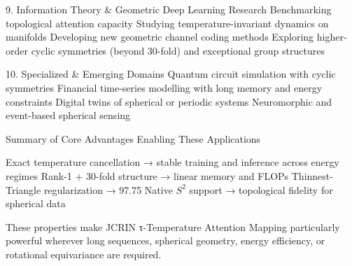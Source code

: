 9. Information Theory & Geometric Deep Learning Research
Benchmarking topological attention capacity
Studying temperature-invariant dynamics on manifolds
Developing new geometric channel coding methods
Exploring higher-order cyclic symmetries (beyond 30-fold) and exceptional group structures

10. Specialized & Emerging Domains
Quantum circuit simulation with cyclic symmetries
Financial time-series modelling with long memory and energy constraints
Digital twins of spherical or periodic systems
Neuromorphic and event-based spherical sensing

Summary of Core Advantages Enabling These Applications

Exact temperature cancellation → stable training and inference across energy regimes  
Rank-1 + 30-fold structure → linear memory and FLOPs  
Thinnest-Triangle regularization → 97.75 %
Native \(S^2\) support → topological fidelity for spherical data  

These properties make JCRIN τ-Temperature Attention Mapping particularly powerful wherever long sequences, spherical geometry, energy efficiency, or rotational equivariance are required.
